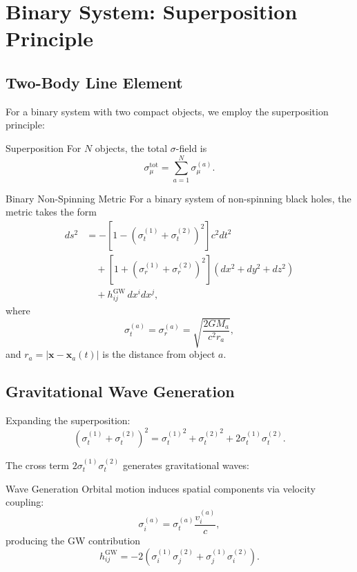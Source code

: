 \documentclass[11pt,a4paper]{article}
\theoremstyle{definition}
\theoremstyle{remark}
\begin{document}
	\section{Binary System: Superposition Principle}
	
	\subsection{Two-Body Line Element}
	
	For a binary system with two compact objects, we employ the superposition principle:
	
	Superposition
		For $N$ objects, the total $\sigma$-field is
		\begin{equation}
			\sigma_\mu^{\text{tot}} = \sum_{a=1}^N \sigma_\mu^{(a)}.
		\end{equation}
	
	Binary Non-Spinning Metric
		For a binary system of non-spinning black holes, the metric takes the form
		\begin{equation}
			\boxed{
				\begin{aligned}
					ds^2 &= -\left[1 - \left(\sigma_t^{(1)} + \sigma_t^{(2)}\right)^2\right] c^2 dt^2\\
					&\quad + \left[1 + \left(\sigma_r^{(1)} + \sigma_r^{(2)}\right)^2\right](dx^2 + dy^2 + dz^2)\\
					&\quad + h_{ij}^{\text{GW}} \, dx^i dx^j,
				\end{aligned}
			}
		\end{equation}
		where
		\begin{equation}
			\sigma_t^{(a)} = \sigma_r^{(a)} = \sqrt{\frac{2GM_a}{c^2 r_a}},
		\end{equation}
		and $r_a = |\mathbf{x} - \mathbf{x}_a(t)|$ is the distance from object $a$.
	
	\subsection{Gravitational Wave Generation}
	
	Expanding the superposition:
	\begin{equation}
		(\sigma_t^{(1)} + \sigma_t^{(2)})^2 = {\sigma_t^{(1)}}^2 + {\sigma_t^{(2)}}^2 + 2\sigma_t^{(1)}\sigma_t^{(2)}.
	\end{equation}
	
	The cross term $2\sigma_t^{(1)}\sigma_t^{(2)}$ generates gravitational waves:
	
	Wave Generation
		Orbital motion induces spatial components via velocity coupling:
		\begin{equation}
			\sigma_i^{(a)} = \sigma_t^{(a)} \frac{v_i^{(a)}}{c},
		\end{equation}
		producing the GW contribution
		\begin{equation}
			h_{ij}^{\text{GW}} = -2\left(\sigma_i^{(1)}\sigma_j^{(2)} + \sigma_j^{(1)}\sigma_i^{(2)}\right).
		\end{equation}
	
\end{document}
